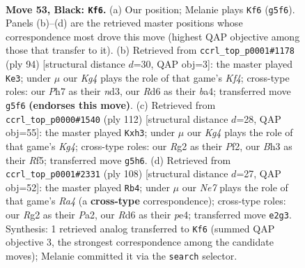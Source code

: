 \documentclass[11pt]{article}
\begin{document}
\clearpage

\begin{figure}[p]\centering
\begin{subfigure}{0.46\textwidth}\centering
\resizebox{\linewidth}{!}{%
\newchessgame
\chessboard[
  setfen={8/7p/3r4/4p1k1/1p2K1P1/7b/4n1r1/8 b - - 1 53},
  showmover=false,
  pgfstyle=straightmove, color=movearrow, markmove={g5-f6}
]}
\caption{}
\end{subfigure}\hfill
\begin{subfigure}{0.46\textwidth}\centering
\resizebox{\linewidth}{!}{%
\newchessgame
\chessboard[
  setfen={8/8/3k4/5p1R/bP3K1P/3n4/8/8 w - - 1 48},
  showmover=false,
  pgfstyle=straightmove, color=movearrow, markmove={f4-e3}
]}
\caption{}
\end{subfigure}
\\[4pt]
\begin{subfigure}{0.46\textwidth}\centering
\resizebox{\linewidth}{!}{%
\newchessgame
\chessboard[
  setfen={8/8/3k4/5Rp1/6K1/7p/1r3P1P/8 w - - 4 57},
  showmover=false,
  pgfstyle=straightmove, color=movearrow, markmove={g4-h3}
]}
\caption{}
\end{subfigure}\hfill
\begin{subfigure}{0.46\textwidth}\centering
\resizebox{\linewidth}{!}{%
\newchessgame
\chessboard[
  setfen={8/1r6/1P6/8/R3p3/5k1p/P4P1K/8 w - - 1 55},
  showmover=false,
  pgfstyle=straightmove, color=movearrow, markmove={a4-b4}
]}
\caption{}
\end{subfigure}
\caption{\textbf{Move 53, Black: \texttt{Kf6}.} (a) Our position; Melanie plays \texttt{Kf6} (\texttt{g5f6}). Panels (b)--(d) are the retrieved master positions whose correspondence most drove this move (highest QAP objective among those that transfer to it). (b) Retrieved from \texttt{ccrl\_top\_p0001\#1178} (ply 94) [structural distance $d$=30, QAP obj=3]: the master played \texttt{Ke3}; under $\mu$ our \emph{Kg4} plays the role of that game's \emph{Kf4}; cross-type roles: our \emph{P}h7 as their \emph{n}d3, our \emph{R}d6 as their \emph{b}a4; transferred move \texttt{g5f6} \textbf{(endorses this move)}. (c) Retrieved from \texttt{ccrl\_top\_p0000\#1540} (ply 112) [structural distance $d$=28, QAP obj=55]: the master played \texttt{Kxh3}; under $\mu$ our \emph{Kg4} plays the role of that game's \emph{Kg4}; cross-type roles: our \emph{R}g2 as their \emph{P}f2, our \emph{B}h3 as their \emph{R}f5; transferred move \texttt{g5h6}. (d) Retrieved from \texttt{ccrl\_top\_p0001\#2331} (ply 108) [structural distance $d$=27, QAP obj=52]: the master played \texttt{Rb4}; under $\mu$ our \emph{Ne7} plays the role of that game's \emph{Ra4} (a \textbf{cross-type} correspondence); cross-type roles: our \emph{R}g2 as their \emph{P}a2, our \emph{R}d6 as their \emph{p}e4; transferred move \texttt{e2g3}. Synthesis: 1 retrieved analog transferred to \texttt{Kf6} (summed QAP objective 3, the strongest correspondence among the candidate moves); Melanie committed it via the \texttt{search} selector.}
\label{fig:thought-m105}
\end{figure}
\end{document}
